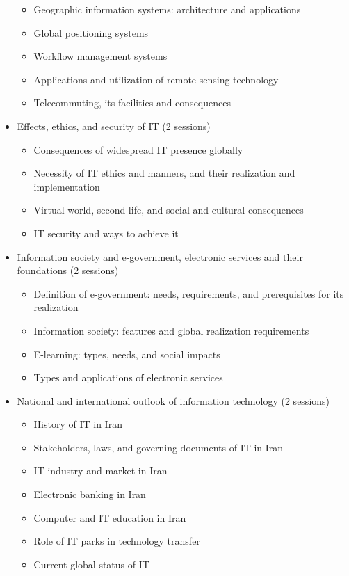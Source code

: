 \documentclass[12pt]{article}
\begin{document}
\begin{itemize}
    \begin{itemize}
        \item Geographic information systems: architecture and applications
        \item Global positioning systems
        \item Workflow management systems
        \item Applications and utilization of remote sensing technology
        \item Telecommuting, its facilities and consequences
    \end{itemize}
    \item Effects, ethics, and security of IT (2 sessions)
    \begin{itemize}
        \item Consequences of widespread IT presence globally
        \item Necessity of IT ethics and manners, and their realization and implementation
        \item Virtual world, second life, and social and cultural consequences
        \item IT security and ways to achieve it
    \end{itemize}
    \item Information society and e-government, electronic services and their foundations (2 sessions)
    \begin{itemize}
        \item Definition of e-government: needs, requirements, and prerequisites for its realization
        \item Information society: features and global realization requirements
        \item E-learning: types, needs, and social impacts
        \item Types and applications of electronic services
    \end{itemize}
    \item National and international outlook of information technology (2 sessions)
    \begin{itemize}
        \item History of IT in Iran
        \item Stakeholders, laws, and governing documents of IT in Iran
        \item IT industry and market in Iran
        \item Electronic banking in Iran
        \item Computer and IT education in Iran
        \item Role of IT parks in technology transfer
        \item Current global status of IT
    \end{itemize}
\end{itemize}
\end{document}
